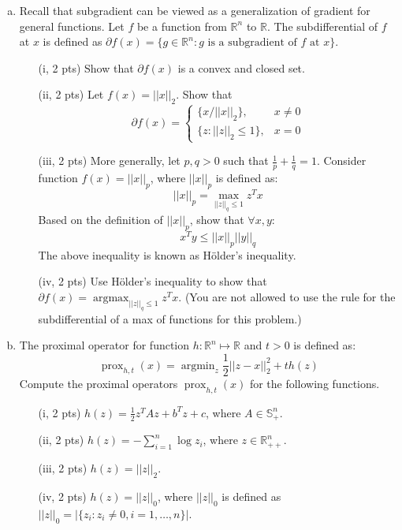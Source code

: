 \documentclass{article}
\theoremstyle{remark}
\theoremstyle{definition}
\newcommand{\argmin}{\mathop{\mathrm{argmin}}}
\newcommand{\argmax}{\mathop{\mathrm{argmax}}}
\newcommand{\prox}{\operatorname{prox}}
\def\R{\mathbb{R}}
\begin{document}
\begin{enumerate}[(a)]
    \item   Recall that subgradient can be viewed as a generalization of gradient for general functions. Let $f$ be a function from $\R^n$ to $\R$. The subdifferential of $f$ at $x$ is defined as $\partial f(x) = \{g\in\R^n: g\text{ is a subgradient of $f$ at $x$}\}$.
        \begin{enumerate}
            \item[(i, 2 pts)]  Show that $\partial f(x)$ is a convex and closed set. 

            \item[(ii, 2 pts)]Let $f(x) = ||x||_2$. Show that 
            $$
            \partial f(x) = \begin{cases}
            \{x / ||x||_2\}, & x\neq 0 \\
            \{z: ||z||_2\leq 1\}, & x = 0
            \end{cases}
            $$

            \item[(iii, 2 pts)] More generally, let $p, q > 0$ such that $\frac{1}{p} + \frac{1}{q} = 1$. Consider function $f(x) = ||x||_p$, where $||x||_p$ is defined as:
            $$||x||_p = \max_{||z||_q \leq 1} z^T x$$
            Based on the definition of $||x||_p$, show that $\forall x, y$:
            $$x^Ty\leq ||x||_p||y||_q$$
            The above inequality is known as H\"{o}lder's inequality.

            \item [(iv, 2 pts)] Use H\"{o}lder's inequality to show
              that $\partial f(x) = \argmax_{||z||_q \leq 1} z^T
              x$. (You are not allowed to use the rule for the
              subdifferential of a max of functions for this problem.) 
        \end{enumerate}

    \item   The proximal operator for function $h: \R^n\mapsto\R$ and $t > 0$ is defined as:
            $$\prox_{h,t}(x) = \argmin_{z}\frac{1}{2}||z-x||_2^2 + th(z)$$
            Compute the proximal operators $\prox_{h,t}(x)$ for the following functions.

            \begin{enumerate}
                \item[(i, 2 pts)]  $h(z) = \frac{1}{2}z^TAz + b^Tz + c$, where $A\in\mathbb{S}_+^n$.

                \item[(ii, 2 pts)]  $h(z) = -\sum_{i=1}^n \log z_i$, where $z\in\R_{++}^n$.

                \item[(iii, 2 pts)] $h(z) = ||z||_2$.

                \item[(iv, 2 pts)] $h(z) = ||z||_0$, where $||z||_0$ is defined as $||z||_0 = |\{z_i: z_i \neq 0, i = 1,\ldots, n\}|$.
            \end{enumerate}
\end{enumerate}
\end{document}
